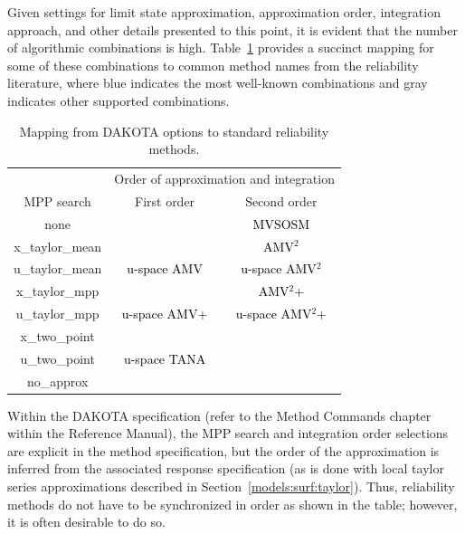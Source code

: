 Given settings for limit state approximation, approximation order,
integration approach, and other details presented to this point, it is
evident that the number of algorithmic combinations is high.
Table~\ref{tab:rel_meth_map} provides a succinct mapping for some of
these combinations to common method names from the reliability
literature, where blue indicates the most well-known combinations and
gray indicates other supported combinations.
\begin{table}
\centering
\caption{Mapping from DAKOTA options to standard reliability methods.}
\label{tab:rel_meth_map}
\begin{tabular}{|c|c|c|}
\hline
& \multicolumn{2}{c|}{Order of approximation and integration} \\ \cline{2-3}
MPP search      & First order & Second order                        \\ \hline
none            & \cellcolor{blue}\textcolor{white}{MVFOSM}
                & \cellcolor[gray]{0.5}\textcolor{black}{MVSOSM}   \\ \hline
x\_taylor\_mean & \cellcolor{blue}\textcolor{white}{AMV}
                & \cellcolor[gray]{0.5}\textcolor{black}{AMV$^2$}  \\ \hline
u\_taylor\_mean & \cellcolor[gray]{0.5}\textcolor{black}{u-space AMV}
                & \cellcolor[gray]{0.5}\textcolor{black}{u-space AMV$^2$} \\
\hline
x\_taylor\_mpp  & \cellcolor{blue}\textcolor{white}{AMV+}
                & \cellcolor[gray]{0.5}\textcolor{black}{AMV$^2$+} \\ \hline
u\_taylor\_mpp  & \cellcolor[gray]{0.5}\textcolor{black}{u-space AMV+}
                & \cellcolor[gray]{0.5}\textcolor{black}{u-space AMV$^2$+} \\
\hline
x\_two\_point   & \cellcolor{blue}\textcolor{white}{TANA}
                & \cellcolor[gray]{0.5}                             \\ \hline
u\_two\_point   & \cellcolor[gray]{0.5}\textcolor{black}{u-space TANA}
                & \cellcolor[gray]{0.5}                             \\ \hline
no\_approx      & \cellcolor{blue}\textcolor{white}{FORM}
                & \cellcolor{blue}\textcolor{white}{SORM}           \\ \hline
\end{tabular}
\end{table}

Within the DAKOTA specification (refer to the Method Commands chapter
within the Reference Manual), the MPP search and integration order
selections are explicit in the method specification, but the order of
the approximation is inferred from the associated response
specification (as is done with local taylor series approximations
described in Section~\ref{models:surf:taylor}).  Thus, reliability
methods do not have to be synchronized in order as shown in the table;
however, it is often desirable to do so.


